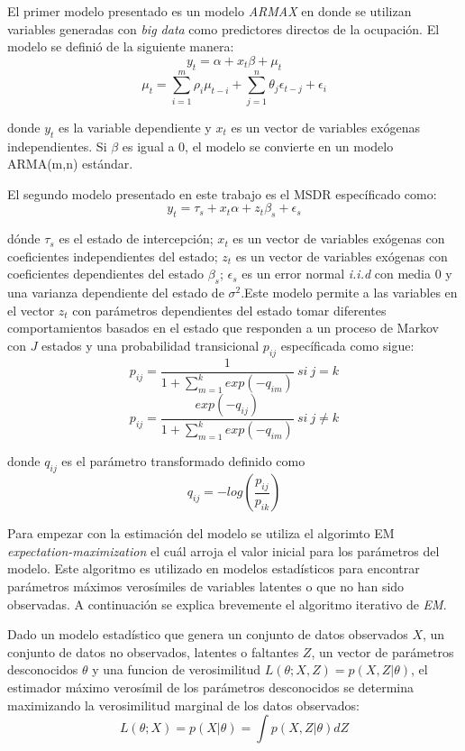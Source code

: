{El primer modelo presentado es un modelo \emph{ARMAX} en donde se utilizan variables generadas con \emph{big data} como predictores directos de la ocupación. El modelo se definió de la siguiente manera: $$y_t = \alpha + x_t \beta + \mu_t$$ $$\mu_t = \sum_{i=1}^{m} \rho_i \mu_{t-i} + \sum_{j=1}^{n} \theta_j \epsilon_{t-j} + \epsilon_i$$

donde $y_t$ es la variable dependiente y $x_t$ es un vector de variables exógenas independientes. Si $\beta$ es igual a 0, el modelo se convierte en un modelo ARMA(m,n) estándar.

El segundo modelo presentado en este trabajo es el MSDR específicado como: $$y_t = \tau_s + x_t \alpha + z_t \beta_s + \epsilon_s$$

dónde $\tau_s$ es el estado de intercepción; $x_t$ es un vector de variables exógenas con coeficientes independientes del estado; $z_t$ es un vector de variables exógenas con coeficientes dependientes del estado $\beta_s$; $\epsilon_s$ es un error normal \emph{i.i.d} con media 0 y una varianza dependiente del estado de $\sigma^2$.Este modelo permite a las variables en el vector $z_t$ con parámetros dependientes del estado tomar diferentes comportamientos basados en el estado que responden a un proceso de Markov con $J$ estados y una probabilidad transicional $p_{ij}$ específicada como sigue: $$p_{ij} = \frac{1}{1 + \sum_{m=1}^{k} exp(-q_{im})}\ si\ j = k$$ $$p_{ij} = \frac{exp(-q_{ij})}{1 + \sum_{m=1}^{k} exp(-q_{im})}\ si\ j \neq k$$

donde $q_{ij}$ es el parámetro transformado definido como $$q_{ij}=-log(\frac{p_{ij}}{p_{ik}})$$

Para empezar con la estimación del modelo se utiliza el algorimto EM \emph{expectation-maximization} el cuál arroja el valor inicial para los parámetros del modelo. Este algoritmo es utilizado en modelos estadísticos para encontrar parámetros máximos verosímiles de variables latentes o que no han sido observadas. A continuación se explica brevemente el algoritmo iterativo de \emph{EM}.

Dado un modelo estadístico que genera un conjunto de datos observados $X$, un conjunto de datos no observados, latentes o faltantes $Z$, un vector de parámetros desconocidos $\theta$ y una funcion de verosimilitud $L(\theta;X,Z) = p(X,Z|\theta)$, el estimador máximo verosímil de los parámetros desconocidos se determina maximizando la verosimilitud marginal de los datos observados: $$L(\theta;X) = p(X|\theta) = \int p(X,Z|\theta)dZ$$

}
